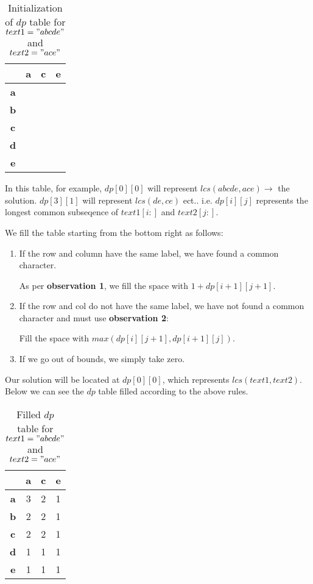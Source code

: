 \begin{table}[htbp]
    \centering
    \begin{tabular}{|c|c|c|c|}
        \hline
          & \textbf{a} & \textbf{c} & \textbf{e} \\
        \hline
        \textbf{a} &   &   &   \\
        \hline
        \textbf{b} &   &   &    \\
        \hline
        \textbf{c} &   &   &    \\
        \hline
        \textbf{d} &   &   &   \\
        \hline
        \textbf{e} &   &   &    \\
        \hline
    \end{tabular}
    \caption{Initialization of $dp$ table for $text1="abcde"$ and $text2="ace"$}
\end{table}

In this table, for example,
$dp[0][0]$ will represent $lcs(abcde,ace) \rightarrow$  the solution.
$dp[3][1]$ will represent $lcs(de,ce)$ ect..
i.e. $dp[i][j]$ represents the longest common subseqence of $text1[i:]$ and $text2[j:]$.

We fill the table starting from the bottom right as follows:
\newpage
\begin{enumerate}
    \item If the row and column have the same label, we have found a common character.

    As per \textbf{observation 1}, we fill the space with $1 + dp[i+1][j+1]$.
    
    \item If the row and col do not have the same label, we have not found a common character and must use \textbf{observation 2}:

    Fill the space with $max(dp[i][j+1], dp[i+1][j])$.
    
    \item If we go out of bounds, we simply take zero.
\end{enumerate}

Our solution will be located at $dp[0][0]$, which represents $lcs(text1,text2)$. Below we can see the $dp$ table filled according to the above rules.

\begin{table}[htbp]
    \centering
    \begin{tabular}{|c|c|c|c|}
        \hline
          & \textbf{a} & \textbf{c} & \textbf{e} \\
        \hline
        \textbf{a} & 3 & 2 & 1 \\
        \hline
        \textbf{b} & 2 & 2 & 1  \\
        \hline
        \textbf{c} & 2 & 2 & 1  \\
        \hline
        \textbf{d} & 1 & 1 & 1 \\
        \hline
        \textbf{e} & 1 & 1 & 1  \\
        \hline
    \end{tabular}
    \label{tab:lcs-dp-table}
    \caption{Filled $dp$ table for $text1="abcde"$ and $text2="ace"$}
\end{table}

